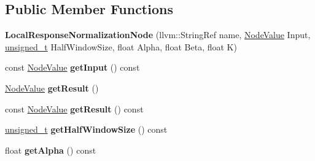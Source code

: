 \subsection*{Public Member Functions}
\begin{DoxyCompactItemize}
\item 
\mbox{\label{classglow_1_1_local_response_normalization_node_ac63ee57c90ca93789758beefda57cfe5}} 
{\bfseries Local\+Response\+Normalization\+Node} (llvm\+::\+String\+Ref name, \hyperlink{structglow_1_1_node_value}{Node\+Value} Input, \hyperlink{namespaceglow_a0ca574644e1e42ef193a9947fb4d8911}{unsigned\+\_\+t} Half\+Window\+Size, float Alpha, float Beta, float K)
\item 
\mbox{\label{classglow_1_1_local_response_normalization_node_a854f3848cd78c7f3694026012a520956}} 
const \hyperlink{structglow_1_1_node_value}{Node\+Value} {\bfseries get\+Input} () const
\item 
\mbox{\label{classglow_1_1_local_response_normalization_node_a99851025f7840829533e4b507da2d561}} 
\hyperlink{structglow_1_1_node_value}{Node\+Value} {\bfseries get\+Result} ()
\item 
\mbox{\label{classglow_1_1_local_response_normalization_node_a5035d3d25f92b6c4c6b1bcce3fd7a46c}} 
const \hyperlink{structglow_1_1_node_value}{Node\+Value} {\bfseries get\+Result} () const
\item 
\mbox{\label{classglow_1_1_local_response_normalization_node_a3643d296ae8303978269b98aafe18966}} 
\hyperlink{namespaceglow_a0ca574644e1e42ef193a9947fb4d8911}{unsigned\+\_\+t} {\bfseries get\+Half\+Window\+Size} () const
\item 
\mbox{\label{classglow_1_1_local_response_normalization_node_ae8af33bd0dbc1dee78c945733da5cc49}} 
float {\bfseries get\+Alpha} () const
\item 
\mbox{\label{classglow_1_1_local_response_normalization_node_a84e36c28e2b9061ee723a175e77b662a}} 

\end{DoxyCompactItemize}
